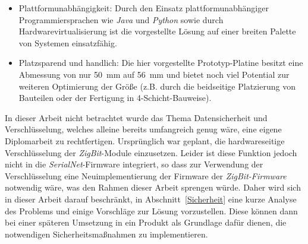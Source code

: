 \begin{itemize}
    \item{Plattformunabhängigkeit:} Durch den Einsatz plattformunabhängiger Programmiersprachen wie \emph{Java}
          und \emph{Python} sowie durch Hardwarevirtualisierung ist die vorgestellte Lösung auf
          einer breiten Palette von Systemen einsatzfähig.

    \item{Platzsparend und handlich:} Die hier vorgestellte Prototyp-Platine besitzt eine Abmessung von nur
          50~mm auf 56~mm und bietet noch viel Potential zur weiteren Optimierung der Größe (z.B. durch
          die beidseitige Platzierung von Bauteilen oder der Fertigung in 4-Schicht-Bauweise).
\end{itemize}

In dieser Arbeit nicht betrachtet wurde das Thema Datensicherheit und Verschlüsselung, welches alleine bereits
umfangreich genug wäre, eine eigene Diplomarbeit zu rechtfertigen. Ursprünglich war geplant, die hardwareseitige
Verschlüsselung der \emph{ZigBit}-Module einzusetzen. Leider ist diese Funktion jedoch nicht in die 
\emph{SerialNet}-Firmware integriert, so dass zur Verwendung der Verschlüsselung eine Neuimplementierung der
Firmware der \emph{ZigBit-Firmware} notwendig wäre, was den Rahmen dieser Arbeit sprengen würde. Daher wird
sich in dieser Arbeit darauf beschränkt, in Abschnitt~\ref{Sicherheit} eine kurze Analyse des Problems und einige
Vorschläge zur Lösung vorzustellen. Diese können dann bei einer späteren Umsetzung in ein Produkt als Grundlage
dafür dienen, die notwendigen Sicherheitsmaßnahmen zu implementieren.
